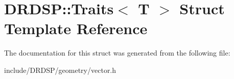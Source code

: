 \hypertarget{struct_d_r_d_s_p_1_1_traits}{\section{D\-R\-D\-S\-P\-:\-:Traits$<$ T $>$ Struct Template Reference}
\label{struct_d_r_d_s_p_1_1_traits}
}


The documentation for this struct was generated from the following file\-:\begin{DoxyCompactItemize}
\item 
include/\-D\-R\-D\-S\-P/geometry/vector.\-h\end{DoxyCompactItemize}

